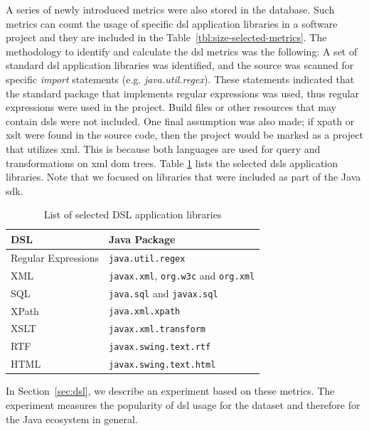\documentclass{sig-alternate}
\begin{document}
A series of newly introduced metrics were also stored in the database. Such metrics can count the usage of specific {\sc dsl} application libraries in a software project and they are included in the Table~\ref{tbl:size-selected-metrics}. The methodology to identify and calculate the {\sc dsl} metrics was the following: A set of standard {\sc dsl} application libraries was identified, and the source was scanned for specific \textit{import} statements (e.g. \textit{java.util.regex}). These statements indicated that the standard package that implements regular expressions was used, thus regular expressions were used in the project. Build files or other resources that may contain {\sc dsl}s were not included. One final assumption was also made; if {\sc xp}ath or {\sc xslt} were found in the source code, then the project would be marked as a project that utilizes {\sc xml}. This is because both languages are used for query and transformations on {\sc xml} {\sc dom} trees. Table \ref{tbl:dsl-list} lists the selected {\sc dsl}s application libraries. Note that we focused on libraries that were included as part of the Java {\sc sdk}.

\begin{table}
\centering
\caption{List of selected DSL application libraries}
\label{tbl:dsl-list}
\begin{tabular}{l l}
 \hline
\textbf{DSL} & \textbf{Java Package}\\
\hline
Regular Expressions & \verb|java.util.regex|\\
XML & \verb|javax.xml|, \verb|org.w3c| and \verb|org.xml|\\
SQL & \verb|java.sql| and \verb|javax.sql|\\
XPath & \verb|java.xml.xpath|\\
XSLT & \verb|javax.xml.transform|\\
RTF & \verb|javax.swing.text.rtf|\\
HTML & \verb|javax.swing.text.html|\\
\hline
\end{tabular}
\end{table}

In Section~\ref{sec:dsl}, we describe an experiment based on these metrics. The experiment measures the popularity of {\sc dsl} usage for the dataset and therefore for the Java ecosystem in general.
\end{document}
